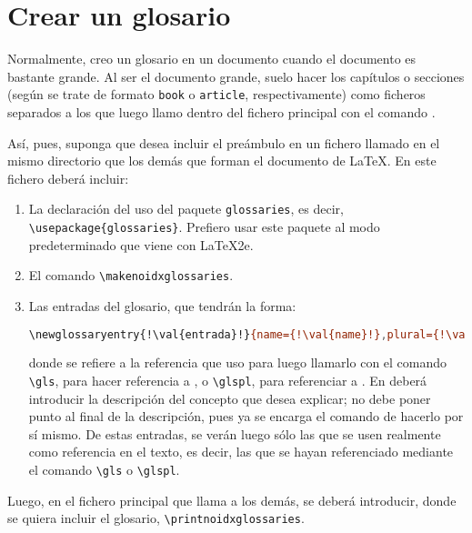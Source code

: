 \section{Crear un glosario}\label{sec:tex-glos}
Normalmente, creo un glosario en un documento cuando el documento es bastante grande. Al ser el documento
grande, suelo hacer los capítulos o secciones (según se trate de formato \lstinline+book+ o \lstinline+article+,
respectivamente) como ficheros separados a los que luego llamo dentro del fichero principal con el comando
\lstinline++.

Así, pues, suponga que desea incluir el preámbulo en un fichero llamado  en el mismo directorio
que los demás que forman el documento de \LaTeX. En este fichero  deberá incluir:

\begin{enumerate}

  \item La declaración del uso del paquete \lstinline+glossaries+, es decir,
    \lstinline+\usepackage{glossaries}+. Prefiero usar este paquete al modo predeterminado que viene con
    \LaTeX{}2e.

  \item El comando \lstinline+\makenoidxglossaries+.

  \item Las entradas del glosario, que tendrán la forma:

    \begin{lstlisting}[gobble=6,language=bash,style=bashinteract,escapechar=!]
      \newglossaryentry{!\val{entrada}!}{name={!\val{name}!},plural={!\val{plural}!},description={!\val{description}!}}
    \end{lstlisting}

    \noindent donde  se refiere a la referencia que uso para luego llamarlo con el comando
    \lstinline+\gls+, para hacer referencia a , o \lstinline+\glspl+, para referenciar a . En
     deberá introducir la descripción del concepto que desea explicar; no debe poner punto al
    final de la descripción, pues ya se encarga el comando de hacerlo por sí mismo. De estas entradas, se verán
    luego sólo las que se usen realmente como referencia en el texto, es decir, las que se hayan referenciado
    mediante el comando \lstinline+\gls+ o \lstinline+\glspl+.

\end{enumerate}

Luego, en el fichero principal que llama a los demás, se deberá introducir, donde se quiera incluir el glosario,
\lstinline+\printnoidxglossaries+.
